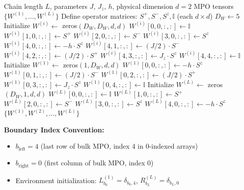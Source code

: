 \documentclass[aps,prb,onecolumn,scriptaddress]{revtex4-2}
\newcommand{\Id}{\mathbb{I}}
\begin{document}
\begin{algorithm}[H]
	\caption{ConstructHeisenbergMPO}
	\begin{algorithmic}[1]
		\Require Chain length $L$, parameters $J$, $J_z$, $h$, physical dimension $d=2$
		\Ensure MPO tensors $\{W^{(1)}, \ldots, W^{(L)}\}$
		\State Define operator matrices: $S^+, S^-, S^z, \Id$ (each $d \times d$)
		\State $D_W \gets 5$ 
		\State {}
		\State Initialize $W^{(i)} \gets$ zeros$(D_W, D_W, d, d)$ 
		\State $W^{(i)}[0, 0, :, :] \gets \Id$ 
		\State $W^{(i)}[1, 0, :, :] \gets S^+$ 
		\State $W^{(i)}[2, 0, :, :] \gets S^-$ 
		\State $W^{(i)}[3, 0, :, :] \gets S^z$ 
		\State $W^{(i)}[4, 0, :, :] \gets -h \cdot S^z$ 
		\State $W^{(i)}[4, 1, :, :] \gets (J/2) \cdot S^-$ 
		\State $W^{(i)}[4, 2, :, :] \gets (J/2) \cdot S^+$ 
		\State $W^{(i)}[4, 3, :, :] \gets J_z \cdot S^z$ 
		\State $W^{(i)}[4, 4, :, :] \gets \Id$ 
		\State {}
		\EndFor
		\State {}
		\State Initialize $W^{(1)} \gets$ zeros$(1, D_W, d, d)$ 
		\State $W^{(1)}[0, 0, :, :] \gets -h \cdot S^z$ 
		\State $W^{(1)}[0, 1, :, :] \gets (J/2) \cdot S^-$
		\State $W^{(1)}[0, 2, :, :] \gets (J/2) \cdot S^+$
		\State $W^{(1)}[0, 3, :, :] \gets J_z \cdot S^z$
		\State $W^{(1)}[0, 4, :, :] \gets \Id$
		\State {}
		\State {}
		\State Initialize $W^{(L)} \gets$ zeros$(D_W, 1, d, d)$ 
		\State $W^{(L)}[0, 0, :, :] \gets \Id$
		\State $W^{(L)}[1, 0, :, :] \gets S^+$
		\State $W^{(L)}[2, 0, :, :] \gets S^-$
		\State $W^{(L)}[3, 0, :, :] \gets S^z$
		\State $W^{(L)}[4, 0, :, :] \gets -h \cdot S^z$ 
		\State {}
		\State \Return $\{W^{(1)}, W^{(2)}, \ldots, W^{(L)}\}$
		\end{algorithmic}
	\end{algorithm}

\textbf{Boundary Index Convention:}
\begin{itemize}
\item $b_{\text{left}} = 4$ (last row of bulk MPO, index 4 in 0-indexed arrays)
\item $b_{\text{right}} = 0$ (first column of bulk MPO, index 0)
\item Environment initialization: $L^{(1)}_{b_0} = \delta_{b_0, 4}$, $R^{(L)}_{b_L} = \delta_{b_L, 0}$
\end{itemize}
\end{document}
